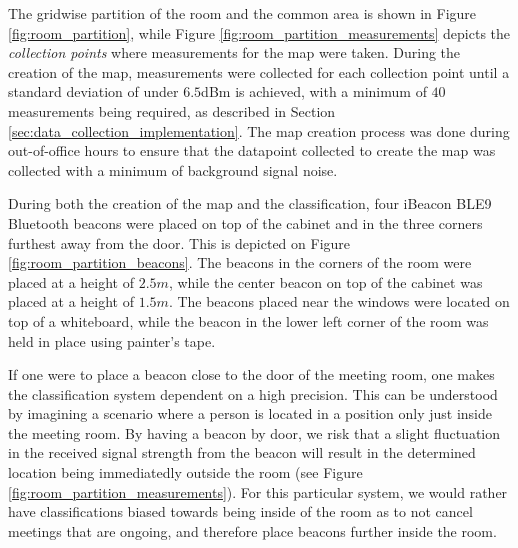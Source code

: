 The gridwise partition of the room and the common area is shown in Figure \ref{fig:room_partition}, while Figure \ref{fig:room_partition_measurements} depicts the \textit{collection points} where measurements for the map were taken.
During the creation of the map, measurements were collected for each collection point until a standard deviation of under $6.5$dBm is achieved, with a minimum of $40$ measurements being required, as described in Section \ref{sec:data_collection_implementation}.
The map creation process was done during out-of-office hours to ensure that the datapoint collected to create the map was collected with a minimum of background signal noise.

During both the creation of the map and the classification, four iBeacon BLE9 Bluetooth beacons \cite{BluetoothiBeaconBLE9} were placed on top of the cabinet and in the three corners furthest away from the door. This is depicted on Figure \ref{fig:room_partition_beacons}.
The beacons in the corners of the room were placed at a height of $2.5m$, while the center beacon on top of the cabinet was placed at a height of $1.5m$.
The beacons placed near the windows were located on top of a whiteboard, while the beacon in the lower left corner of the room was held in place using painter's tape.

If one were to place a beacon close to the door of the meeting room, one makes the classification system dependent on a high precision.
This can be understood by imagining a scenario where a person is located in a position only just inside the meeting room.
By having a beacon by door, we risk that a slight fluctuation in the received signal strength from the beacon will result in the determined location being immediatedly outside the room (see Figure \ref{fig:room_partition_measurements}).
For this particular system, we would rather have classifications biased towards being inside of the room as to not cancel meetings that are ongoing, and  therefore place beacons further inside the room.
